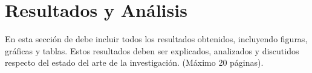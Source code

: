 \chapter{Resultados y Análisis}
\label{ch:resultados} %

{\color{blue} En esta sección de debe incluir todos los resultados obtenidos, incluyendo figuras, gráficas y tablas. Estos resultados deben ser explicados, analizados y discutidos respecto del estado del arte de la investigación. (Máximo 20 páginas). }